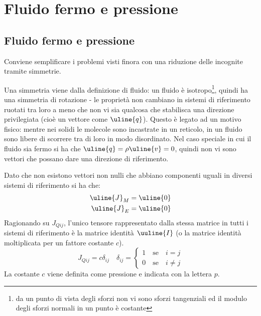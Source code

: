 %
\section{Fluido fermo e pressione}
\subsection{Fluido fermo e pressione}
Conviene semplificare i problemi visti finora con una riduzione delle incognite tramite simmetrie.

Una simmetria viene dalla definizione di fluido: un fluido è isotropo\footnote{da un punto di vista degli sforzi non vi sono sforzi tangenziali ed il modulo degli sforzi normali in un punto è costante}, quindi ha una simmetria di rotazione - le proprietà non cambiano in sistemi di riferimento ruotati tra loro a meno che non vi sia qualcosa che stabilisca una direzione privilegiata (cioè un vettore come $\uline{q}$).
Questo è legato ad un motivo fisico: mentre nei solidi le molecole sono incastrate in un reticolo, in un fluido sono libere di scorrere tra di loro in modo disordinato.
Nel caso speciale in cui il fluido sia fermo si ha che $\uline{q} = \rho \uline{v} = 0$, quindi non vi sono vettori che possano dare una direzione di riferimento.

Dato che non esistono vettori non nulli che abbiano componenti uguali in diversi sistemi di riferimento si ha che:
	\begin{equation*}
		\begin{aligned}
			\uline{J}_M = \uline{0} \\
			\uline{J}_E = \uline{0}
		\end{aligned}
	\end{equation*}
Ragionando su $J_{Qij}$, l'unico tensore rappresentato dalla stessa matrice in tutti i sistemi di riferimento è la matrice identità $\uuline{I}$ (o la matrice identità moltiplicata per un fattore costante $c$).
	\begin{equation*}
		J_{Qij} = c \delta_{ij} \quad \delta_{ij} = 
		\left\{ 
			\begin{aligned}
				1 \quad \text{se} \quad i=j \\ 
				0 \quad \text{se} \quad i \neq j 
			\end{aligned} 
		\right.
	\end{equation*}
La costante $c$ viene definita come pressione e indicata con la lettera $p$.

